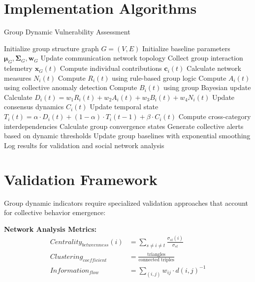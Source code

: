 \documentclass[11pt,a4paper]{article}
\begin{document}
\section{Implementation Algorithms}

\begin{algorithm}
\caption{Group Dynamic Vulnerability Assessment}
\begin{algorithmic}[1]
\STATE Initialize group structure graph $G = (V, E)$
\STATE Initialize baseline parameters $\boldsymbol{\mu}_G, \boldsymbol{\Sigma}_G, \boldsymbol{w}_G$
    \STATE Update communication network topology
    \STATE Collect group interaction telemetry $\mathbf{x}_G(t)$
        \STATE Compute individual contributions $\mathbf{c}_i(t)$
        \STATE Calculate network measures $N_i(t)$
        \STATE Compute $R_i(t)$ using rule-based group logic
        \STATE Compute $A_i(t)$ using collective anomaly detection
        \STATE Compute $B_i(t)$ using group Bayesian update
        \STATE Calculate $D_i(t) = w_1 R_i(t) + w_2 A_i(t) + w_3 B_i(t) + w_4 N_i(t)$
        \STATE Update consensus dynamics $C_i(t)$
        \STATE Update temporal state $T_i(t) = \alpha \cdot D_i(t) + (1-\alpha) \cdot T_i(t-1) + \beta \cdot C_i(t)$
    \ENDFOR
    \STATE Compute cross-category interdependencies
    \STATE Calculate group convergence states
    \STATE Generate collective alerts based on dynamic thresholds
    \STATE Update group baselines with exponential smoothing
    \STATE Log results for validation and social network analysis
\ENDFOR
\end{algorithmic}
\end{algorithm}

\section{Validation Framework}

Group dynamic indicators require specialized validation approaches that account for collective behavior emergence:

\textbf{Network Analysis Metrics:}
\begin{align}
Centrality_{betweenness}(i) &= \sum_{s \neq i \neq t} \frac{\sigma_{st}(i)}{\sigma_{st}} \\
Clustering_{coefficient} &= \frac{\text{triangles}}{\text{connected triples}} \\
Information_{flow} &= \sum_{(i,j)} w_{ij} \cdot d(i,j)^{-1}
\end{align}
\end{document}
